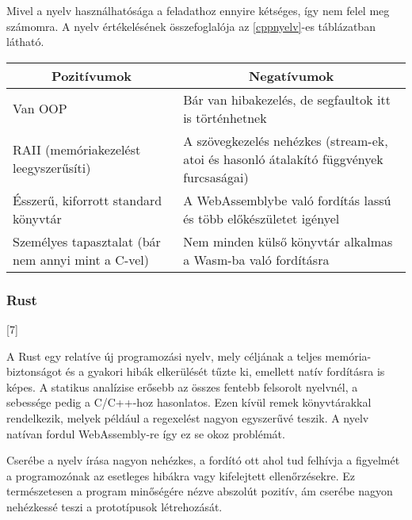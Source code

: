 Mivel a nyelv használhatósága a feladathoz ennyire kétséges, így nem felel meg számomra. A nyelv értékelésének összefoglalója az \ref{cppnyelv}-es táblázatban látható.

\begin{center}
  \begin{tabularx}{\textwidth}{X X}
    \hline
    \multicolumn{1}{c}{\bfseries{Pozitívumok}}         & \multicolumn{1}{c}{\bfseries{Negatívumok}}                                             \\
    \hline
    Van OOP                                            & Bár van hibakezelés, de segfaultok itt is történhetnek                                 \\
    RAII (memóriakezelést leegyszerűsíti)              & A szövegkezelés nehézkes (stream-ek, atoi és hasonló átalakító függvények furcsaságai) \\
    Ésszerű, kiforrott standard könyvtár               & A WebAssemblybe való fordítás lassú és több előkészületet igényel                      \\
    Személyes tapasztalat (bár nem annyi mint a C-vel) & Nem minden külső könyvtár alkalmas a Wasm-ba való fordításra                           \\
    \hline
  \end{tabularx}
\end{center}

\subsubsection{Rust}

[7]

A Rust egy relatíve új programozási nyelv, mely céljának a teljes memória-biztonságot és a gyakori hibák elkerülését tűzte ki, emellett natív fordításra is képes. A statikus analízise erősebb az összes fentebb felsorolt nyelvnél, a sebessége pedig a C/C++-hoz hasonlatos. Ezen kívül remek könyvtárakkal rendelkezik, melyek például a regexelést nagyon egyszerűvé teszik. A nyelv natívan fordul WebAssembly-re így ez se okoz problémát.

Cserébe a nyelv írása nagyon nehézkes, a fordító ott ahol tud felhívja a figyelmét a programozónak az esetleges hibákra vagy kifelejtett ellenőrzésekre. Ez természetesen a program minőségére nézve abszolút pozitív, ám cserébe nagyon nehézkessé teszi a prototípusok létrehozását.

